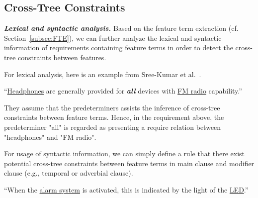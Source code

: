 \documentclass[graybox]{svmult}
\begin{document}

\subsection{Cross-Tree Constraints}
\textit{\textbf{Lexical and syntactic analysis.}} Based on the feature term extraction (cf.\,Section~\ref{subsec:FTE}), we can further analyze the lexical and syntactic information of requirements containing feature terms in order to detect the cross-tree constraints between features. 

For lexical analysis, here is an example from Sree-Kumar et al.~\cite{Sree-KumarPC18}.

\vspace{2mm}
\begin{mdframed}[style=mystyle]
``\uline{Headphones} are generally provided for \textit{\textbf{all}} devices with \uline{FM radio} capability.''
\end{mdframed}
\vspace{4mm}

They assume that the predeterminers assists the inference of cross-tree constraints between feature terms. Hence, in the requirement above, the predeterminer "all" is regarded as presenting a require relation between "headphones" and "FM radio".


For usage of syntactic information, we can simply define a rule that there exist potential cross-tree constraints between feature terms in main clause and modifier clause (e.g., temporal or adverbial clause). 

\vspace{2mm}
\begin{mdframed}[style=mystyle]
``When the \uline{alarm system} is activated, this is indicated by the light of the \uline{LED}.''
\end{mdframed}
\vspace{4mm}
\end{document}
